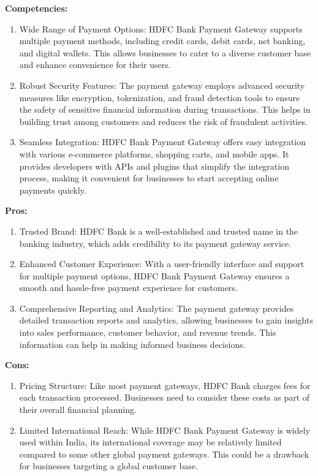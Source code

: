 \textbf{Competencies:}
\begin{enumerate}
\item Wide Range of Payment Options: HDFC Bank Payment Gateway supports multiple payment methods, including credit cards, debit cards, net banking, and digital wallets. This allows businesses to cater to a diverse customer base and enhance convenience for their users.

\item Robust Security Features: The payment gateway employs advanced security measures like encryption, tokenization, and fraud detection tools to ensure the safety of sensitive financial information during transactions. This helps in building trust among customers and reduces the risk of fraudulent activities.

\item Seamless Integration: HDFC Bank Payment Gateway offers easy integration with various e-commerce platforms, shopping carts, and mobile apps. It provides developers with APIs and plugins that simplify the integration process, making it convenient for businesses to start accepting online payments quickly.
\end{enumerate}

\textbf{Pros:}
\begin{enumerate}
\item Trusted Brand: HDFC Bank is a well-established and trusted name in the banking industry, which adds credibility to its payment gateway service.

\item Enhanced Customer Experience: With a user-friendly interface and support for multiple payment options, HDFC Bank Payment Gateway ensures a smooth and hassle-free payment experience for customers.

\item Comprehensive Reporting and Analytics: The payment gateway provides detailed transaction reports and analytics, allowing businesses to gain insights into sales performance, customer behavior, and revenue trends. This information can help in making informed business decisions.
\end{enumerate}

\textbf{Cons:}
\begin{enumerate}
\item Pricing Structure: Like most payment gateways, HDFC Bank charges fees for each transaction processed. Businesses need to consider these costs as part of their overall financial planning.

\item Limited International Reach: While HDFC Bank Payment Gateway is widely used within India, its international coverage may be relatively limited compared to some other global payment gateways. This could be a drawback for businesses targeting a global customer base.
\end{enumerate}

